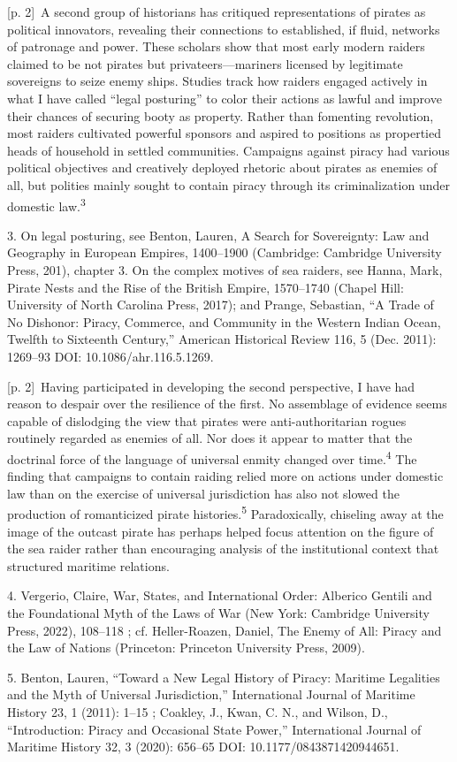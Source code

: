 \documentclass[10pt,a4paper]{article}
\begin{document}
{\scriptsize\color{gray} [p. 2]}\ A second group of historians has critiqued representations of pirates as political innovators, revealing their connections to established, if fluid, networks of patronage and power. These scholars show that most early modern raiders claimed to be not pirates but privateers—mariners licensed by legitimate sovereigns to seize enemy ships. Studies track how raiders engaged actively in what I have called “legal posturing” to color their actions as lawful and improve their chances of securing booty as property. Rather than fomenting revolution, most raiders cultivated powerful sponsors and aspired to positions as propertied heads of household in settled communities. Campaigns against piracy had various political objectives and creatively deployed rhetoric about pirates as enemies of all, but polities mainly sought to contain piracy through its criminalization under domestic law.\nobreak\textsuperscript{3}\par{\small 3. On legal posturing, see Benton, Lauren, A Search for Sovereignty: Law and Geography in European Empires, 1400–1900 (Cambridge: Cambridge University Press, 201), chapter 3. On the complex motives of sea raiders, see Hanna, Mark, Pirate Nests and the Rise of the British Empire, 1570–1740 (Chapel Hill: University of North Carolina Press, 2017); and Prange, Sebastian, “A Trade of No Dishonor: Piracy, Commerce, and Community in the Western Indian Ocean, Twelfth to Sixteenth Century,” American Historical Review 116, 5 (Dec. 2011): 1269–93 DOI: 10.1086/ahr.116.5.1269.\par}
{\scriptsize\color{gray} [p. 2]}\ Having participated in developing the second perspective, I have had reason to despair over the resilience of the first. No assemblage of evidence seems capable of dislodging the view that pirates were anti-authoritarian rogues routinely regarded as enemies of all. Nor does it appear to matter that the doctrinal force of the language of universal enmity changed over time.\nobreak\textsuperscript{4} The finding that campaigns to contain raiding relied more on actions under domestic law than on the exercise of universal jurisdiction has also not slowed the production of romanticized pirate histories.\nobreak\textsuperscript{5} Paradoxically, chiseling away at the image of the outcast pirate has perhaps helped focus attention on the figure of the sea raider rather than encouraging analysis of the institutional context that structured maritime relations.\par{\small 4. Vergerio, Claire, War, States, and International Order: Alberico Gentili and the Foundational Myth of the Laws of War (New York: Cambridge University Press, 2022), 108–118 ; cf. Heller-Roazen, Daniel, The Enemy of All: Piracy and the Law of Nations (Princeton: Princeton University Press, 2009).\par}{\small 5. Benton, Lauren, “Toward a New Legal History of Piracy: Maritime Legalities and the Myth of Universal Jurisdiction,” International Journal of Maritime History 23, 1 (2011): 1–15 ; Coakley, J., Kwan, C. N., and Wilson, D., “Introduction: Piracy and Occasional State Power,” International Journal of Maritime History 32, 3 (2020): 656–65 DOI: 10.1177/0843871420944651.\par}
\end{document}
